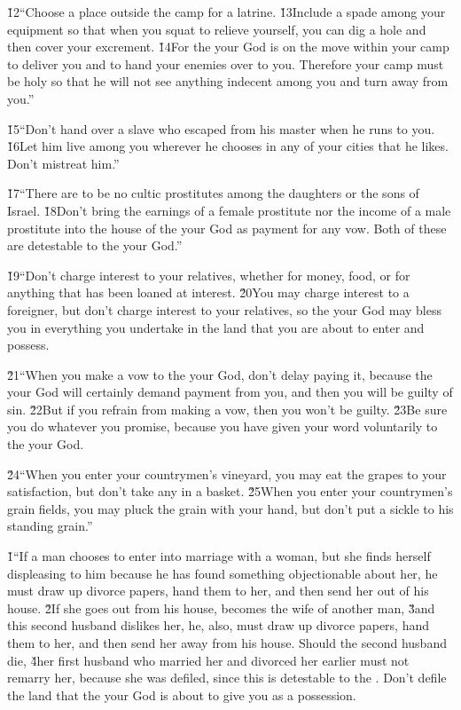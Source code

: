 \v{12}``Choose a place outside the camp for a latrine. \v{13}Include a spade among your equipment so that when you squat to relieve yourself, you can dig a hole and then cover your excrement. \v{14}For the  your God is on the move within your camp to deliver you and to hand your enemies over to you. Therefore your camp must be holy so that he will not see anything indecent among you and turn away from you.''

\v{15}``Don't hand over a slave who escaped from his master when he runs to you. \v{16}Let him live among you wherever he chooses in any of your cities that he likes. Don't mistreat him.''

\v{17}``There are to be no cultic prostitutes among the daughters or the sons of Israel. \v{18}Don't bring the earnings of a female prostitute nor the income of a male prostitute into the house of the  your God as payment for any vow. Both of these are detestable to the  your God.''

\v{19}``Don't charge interest to your relatives, whether for money, food, or for anything that has been loaned at interest. \v{20}You may charge interest to a foreigner, but don't charge interest to your relatives, so the  your God may bless you in everything you undertake in the land that you are about to enter and possess.

\v{21}``When you make a vow to the  your God, don't delay paying it, because the  your God will certainly demand payment from you, and then you will be guilty of sin. \v{22}But if you refrain from making a vow, then you won't be guilty. \v{23}Be sure you do whatever you promise, because you have given your word voluntarily to the  your God.

\v{24}``When you enter your countrymen's vineyard, you may eat the grapes to your satisfaction, but don't take any in a basket. \v{25}When you enter your countrymen's grain fields, you may pluck the grain with your hand, but don't put a sickle to his standing grain.''

\v{1}``If a man chooses to enter into marriage with a woman, but she finds herself displeasing to him because he has found something objectionable about her, he must draw up divorce papers, hand them to her, and then send her out of his house. \v{2}If she goes out from his house, becomes the wife of another man, \v{3}and this second husband dislikes her, he, also, must draw up divorce papers, hand them to her, and then send her away from his house. Should the second husband die, \v{4}her first husband who married her and divorced her earlier must not remarry her, because she was defiled, since this is detestable to the . Don't defile the land that the  your God is about to give you as a possession.

